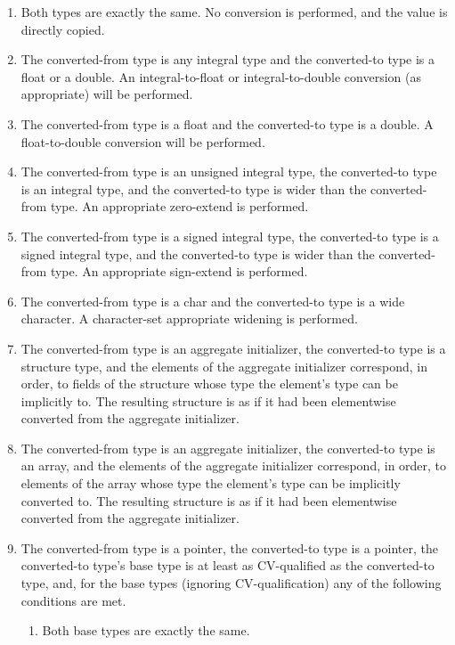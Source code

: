 \documentclass[letterpaper,12pt]{book}
\begin{document}
\begin{enumerate}
	\item Both types are exactly the same. No conversion is performed, and the value is directly copied.
	
	\item The converted-from type is any integral type and the converted-to type is a float or a double. An integral-to-float or integral-to-double conversion (as appropriate) will be performed.
	
	\item The converted-from type is a float and the converted-to type is a double. A float-to-double conversion will be performed.
	
	\item The converted-from type is an unsigned integral type, the converted-to type is an integral type, and the converted-to type is wider than the converted-from type. An appropriate zero-extend is performed.
	
	\item The converted-from type is a signed integral type, the converted-to type is a signed integral type, and the converted-to type is wider than the converted-from type. An appropriate sign-extend is performed.
	
	\item The converted-from type is a char and the converted-to type is a wide character. A character-set appropriate widening is performed.

	\item The converted-from type is an aggregate initializer, the converted-to type is a structure type, and the elements of the aggregate initializer correspond, in order, to fields of the structure whose type the element's type can be implicitly to. The resulting structure is as if it had been elementwise converted from the aggregate initializer.

	\item The converted-from type is an aggregate initializer, the converted-to type is an array, and the elements of the aggregate initializer correspond, in order, to elements of the array whose type the element's type can be implicitly converted to. The resulting structure is as if it had been elementwise converted from the aggregate initializer.

	\item The converted-from type is a pointer, the converted-to type is a pointer, the converted-to type's base type is at least as CV-qualified as the converted-to type, and, for the base types (ignoring CV-qualification) any of the following conditions are met.\label{item:Pointer Rule}
	\begin{enumerate}
		\item Both base types are exactly the same.
		

\end{enumerate}
\end{enumerate}
\end{document}
